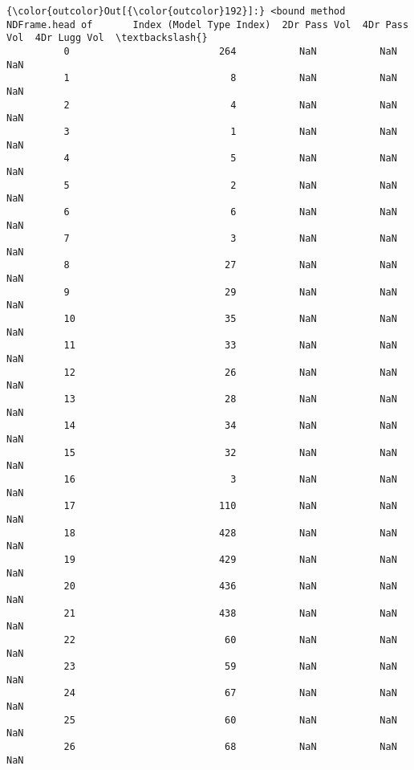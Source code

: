 \documentclass[11pt]{article}
\begin{document}
            \begin{Verbatim}[commandchars=\\\{\}]
{\color{outcolor}Out[{\color{outcolor}192}]:} <bound method NDFrame.head of       Index (Model Type Index)  2Dr Pass Vol  4Dr Pass Vol  4Dr Lugg Vol  \textbackslash{}
          0                          264           NaN           NaN           NaN   
          1                            8           NaN           NaN           NaN   
          2                            4           NaN           NaN           NaN   
          3                            1           NaN           NaN           NaN   
          4                            5           NaN           NaN           NaN   
          5                            2           NaN           NaN           NaN   
          6                            6           NaN           NaN           NaN   
          7                            3           NaN           NaN           NaN   
          8                           27           NaN           NaN           NaN   
          9                           29           NaN           NaN           NaN   
          10                          35           NaN           NaN           NaN   
          11                          33           NaN           NaN           NaN   
          12                          26           NaN           NaN           NaN   
          13                          28           NaN           NaN           NaN   
          14                          34           NaN           NaN           NaN   
          15                          32           NaN           NaN           NaN   
          16                           3           NaN           NaN           NaN   
          17                         110           NaN           NaN           NaN   
          18                         428           NaN           NaN           NaN   
          19                         429           NaN           NaN           NaN   
          20                         436           NaN           NaN           NaN   
          21                         438           NaN           NaN           NaN   
          22                          60           NaN           NaN           NaN   
          23                          59           NaN           NaN           NaN   
          24                          67           NaN           NaN           NaN   
          25                          60           NaN           NaN           NaN   
          26                          68           NaN           NaN           NaN   

\end{Verbatim}
\end{document}
